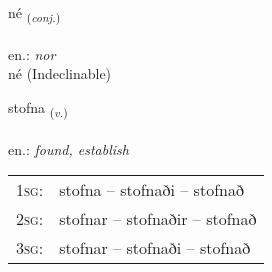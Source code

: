\documentclass[frontgrid, backgrid]{flacards}\usepackage[]{graphicx}\usepackage[]{xcolor}
\begin{document}
\renewcommand{\blhead}{\vskip5pt {\small\bfseries\footnotesize Samtenging | Conjuction }}
\renewcommand{\bcfoot}{\vskip5pt \hspace{2pt}{\small\bfseries\footnotesize 1K}}


{né \small{\textsubscript{(\textit{conj.})}} \\[1ex]
\textphonetic{[njɛː]} \\
en.: \emph{nor} \\  [2ex]
né (Indeclinable)}

\renewcommand{\flhead}{\vskip5pt \fboxsep=0pt {\small\bfseries\footnotesize Sagnorð | Verb}}
\renewcommand{\fcfoot}{\vskip5pt \fboxsep=0pt \hspace{2pt}{\small\bfseries\footnotesize 1K}}

\renewcommand{\blhead}{\vskip5pt {\small\bfseries\footnotesize Sagnorð | Verb }}
\renewcommand{\bcfoot}{\vskip5pt \hspace{2pt}{\small\bfseries\footnotesize 1K}}


{stofna \small{\textsubscript{(\textit{v.})}} \\[1ex] %
\textphonetic{[stɔpna]} \\
en.: \emph{found, establish} \\  [2ex]
\renewcommand*{\arraystretch}{0.8}
\begin{tabular}{p{1cm}l}
\textsc{1sg}: & stofna -- stofnaði -- stofnað \\ 
\textsc{2sg}: & stofnar -- stofnaðir -- stofnað \\ 
\textsc{3sg}: & stofnar -- stofnaði -- stofnað \\ 
\end{tabular}
}

\renewcommand{\flhead}{\vskip5pt \fboxsep=0pt {\small\bfseries\footnotesize Lýsingarorð | Adjective}}
\renewcommand{\fcfoot}{\vskip5pt \fboxsep=0pt \hspace{2pt}{\small\bfseries\footnotesize 1K}}

\renewcommand{\blhead}{\vskip5pt {\small\bfseries\footnotesize Lýsingarorð | Adjective }}
\renewcommand{\bcfoot}{\vskip5pt \hspace{2pt}{\small\bfseries\footnotesize 1K}}
\end{document}
